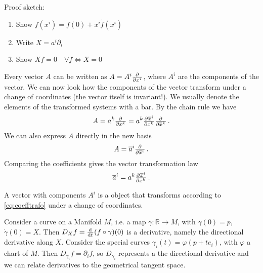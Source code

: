 Proof sketch:
\begin{enumerate}
    \item Show $f(x^i)=f(0)+x^i\tilde{f}(x^i)$
    \item Write $X=a^i\partial_i$
    \item Show $Xf=0\quad \forall f \iff X=0$
\end{enumerate}
Every vector $A$ can be written as $A=A^i\pd{}{{x^i}}$, where $A^i$ are the
components of the vector. We can now look how the components of the vector
transform under a change of coordinates (the vector itself is invariant!). 
We usually denote the elements of the transformed systems with a bar.
By the chain rule we have
\begin{equation}
    A= a^k\pd{}{{x^k}}= a^k\pd{\overline{x}^i}{{x^k}}\pd{}{{\overline{x}^k}}\, .
\end{equation}
We can also express $A$ directly in the new basis
\begin{equation}
    A= \overline{a}^i\pd{}{{\overline{x}^i}}\, .
\end{equation}
Comparing the coefficients gives the vector transformation law
\begin{equation}
    \overline{a}^i=a^k\pd{\overline{x}^i}{{x^k}}\label{eq:coefftrafo}\, .
\end{equation}
\begin{definition} A vector with components $A^i$ is a object that transforms according
to \ref{eq:coefftrafo} under a change of coordinates.
\end{definition}
Consider a curve on a Manifold $M$, i.e. a
map $\gamma:\mathbb{R}\to M$, with $\gamma(0)=p$, $\dot{\gamma}(0)=X$. Then $D_X f=\od{}{t}(f\circ\gamma)(0)$ is
a derivative, namely the directional derivative along $X$.
Consider the special curves $\gamma_i(t)=\varphi(p+te_i)$, with $\varphi$ a
chart of $M$. Then $D_{\dot{\gamma}_i} f=\partial_if$,  so $D_{\dot{\gamma}_i}$
represents a the directional derivative and we can relate derivatives to the
geometrical tangent space.

